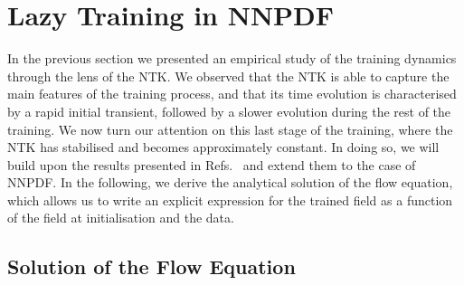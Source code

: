 \section{Lazy Training in NNPDF}
\label{sec:LazyTraining}

In the previous section we presented an empirical study of the training dynamics
through the lens of the NTK. We observed that the NTK is able to capture the
main features of the training process, and that its time evolution is
characterised by a rapid initial transient, followed by a slower evolution
during the rest of the training. We now turn our attention on this last stage of
the training, where the NTK has stabilised and becomes approximately constant.
In doing so, we will build upon the results presented in
Refs.~\cite{jacot2018neural,lee2019wide} and extend them to the case of NNPDF.
In the following, we derive the analytical solution of the flow equation, which
allows us to write an explicit expression for the trained field as a function of
the field at initialisation and the data.

\subsection{Solution of the Flow Equation}
\label{sec:Lazy}

